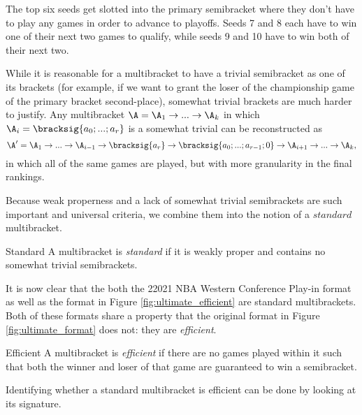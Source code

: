{    

    The top six seeds get slotted into the primary semibracket where they don't have to play any games in order to advance to playoffs. Seeds 7 and 8 each have to win one of their next two games to qualify, while seeds 9 and 10 have to win both of their next two.

    While it is reasonable for a multibracket to have a trivial semibracket as one of its brackets (for example, if we want to grant the loser of the championship game of the primary bracket second-place), somewhat trivial brackets are much harder to justify. Any multibracket $\A = \A_1 \to ... \to \A_k$ in which $\A_i = \bracksig{a_0; ...; a_r}$ is a somewhat trivial can be reconstructed as $$\A' = \A_1 \to ... \to \A_{i-1} \to \bracksig{a_r} \to \bracksig{a_0; ...; a_{r-1}; 0} \to \A_{i+1} \to ... \to \A_k,$$ in which all of the same games are played, but with more granularity in the final rankings.

    Because weak properness and a lack of somewhat trivial semibrackets are such important and universal criteria, we combine them into the notion of a $\textit{standard}$ multibracket.

    \begin{definition}{Standard}{}
        A multibracket is \textit{standard} if it is weakly proper and contains no somewhat trivial semibrackets.
    \end{definition}

    It is now clear that the both the 22021 NBA Western Conference Play-in format as well as the format in Figure \ref{fig:ultimate_efficient} are standard multibrackets. Both of these formats share a property that the original format in Figure \ref{fig:ultimate_format} does not: they are \textit{efficient}.

    \begin{definition}{Efficient}{}
        A multibracket is \textit{efficient} if there are no games played within it such that both the winner and loser of that game are guaranteed to win a semibracket.
    \end{definition}

    Identifying whether a standard multibracket is efficient can be done by looking at its signature.

    }
